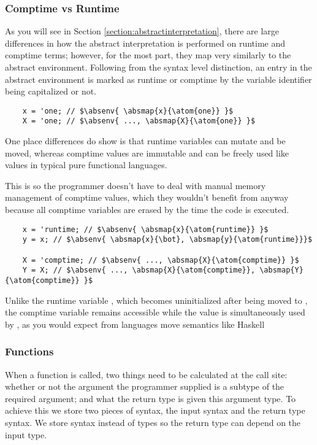 \documentclass[12pt,twoside]{report}
\begin{document}
\subsubsection{Comptime vs Runtime}
As you will see in Section \ref{section:abstractinterpretation}, there are large differences in how the abstract interpretation is performed on runtime and comptime terms; however, for the most part, they map very similarly to the abstract environment. Following from the syntax level distinction, an entry in the abstract environment is marked as runtime or comptime by the variable identifier being capitalized or not.

\begin{listing}[H]
  \begin{verbatim}
    x = 'one; // $\absenv{ \absmap{x}{\atom{one}} }$
    X = 'one; // $\absenv{ ..., \absmap{X}{\atom{one}} }$
  \end{verbatim}
\end{listing}

One place differences do show is that runtime variables can mutate and be moved, whereas comptime values are immutable and can be freely used like values in typical pure functional languages.

This is so the programmer doesn't have to deal with manual memory management of comptime values, which they wouldn't benefit from anyway because all comptime variables are erased by the time the code is executed.

\begin{listing}[H]
  \begin{verbatim}
    x = 'runtime; // $\absenv{ \absmap{x}{\atom{runtime}} }$
    y = x; // $\absenv{ \absmap{x}{\bot}, \absmap{y}{\atom{runtime}}}$
  
    X = 'comptime; // $\absenv{ ..., \absmap{X}{\atom{comptime}} }$
    Y = X; // $\absenv{ ..., \absmap{X}{\atom{comptime}}, \absmap{Y}{\atom{comptime}} }$
  \end{verbatim}
  \caption{Unlike the runtime variable , which becomes uninitialized after being moved to , the comptime variable  remains accessible while the value is simultaneously used by , as you would expect from languages move semantics like Haskell}
\end{listing}

\subsubsection{Functions}
When a function is called, two things need to be calculated at the call site: whether or not the argument the programmer supplied is a subtype of the required argument; and what the return type is given this argument type. To achieve this we store two pieces of syntax, the input syntax and the return type syntax. We store syntax instead of types so the return type can depend on the input type.
\end{document}

